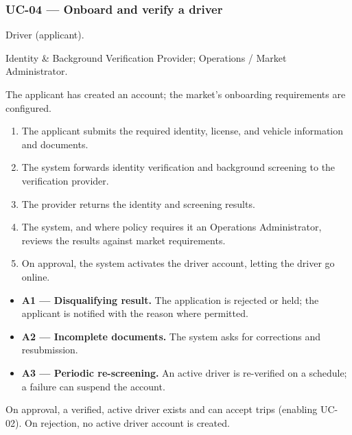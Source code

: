 \subsubsection*{UC-04 --- Onboard and verify a driver}

\begin{description}[leftmargin=2.4cm,style=nextline,font=\normalfont\bfseries]
  \item[Primary actor] Driver (applicant).
  \item[Secondary actors] Identity \& Background Verification Provider;
        Operations / Market Administrator.
  \item[Preconditions] The applicant has created an account; the market's
        onboarding requirements are configured.
  \item[Main flow]
    \begin{enumerate}[leftmargin=1.6em,itemsep=0.15em]
      \item The applicant submits the required identity, license, and vehicle
            information and documents.
      \item The system forwards identity verification and background
            screening to the verification provider.
      \item The provider returns the identity and screening results.
      \item The system, and where policy requires it an Operations
            Administrator, reviews the results against market requirements.
      \item On approval, the system activates the driver account, letting the
            driver go online.
    \end{enumerate}
  \item[Alternative flows]
    \begin{itemize}[leftmargin=1.6em,itemsep=0.15em]
      \item \textbf{A1 --- Disqualifying result.} The application is rejected
            or held; the applicant is notified with the reason where
            permitted.
      \item \textbf{A2 --- Incomplete documents.} The system asks for
            corrections and resubmission.
      \item \textbf{A3 --- Periodic re-screening.} An active driver is
            re-verified on a schedule; a failure can suspend the account.
    \end{itemize}
  \item[Postconditions] On approval, a verified, active driver exists and can
        accept trips (enabling UC-02). On rejection, no active driver account
        is created.
\end{description}


